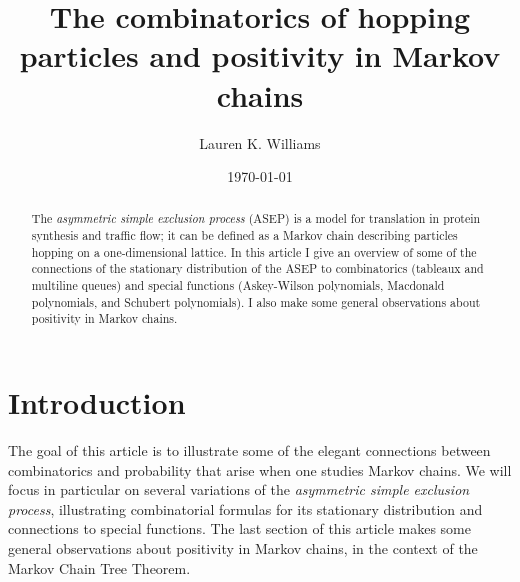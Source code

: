 \documentclass[11pt]{amsart}
\theoremstyle{definition}
\theoremstyle{remark}
\begin{document}
\begin{abstract}
The \emph{asymmetric simple exclusion process} (ASEP) 
is a model for translation in protein synthesis and traffic flow;
it can be defined as a Markov chain
describing particles hopping on a one-dimensional lattice.
In this article
I give an overview of some of the connections of 
the stationary distribution of the ASEP 
 to combinatorics (tableaux and multiline queues)
and special functions (Askey-Wilson polynomials,
Macdonald polynomials, and Schubert polynomials).  I also make some general 
observations about  positivity in Markov chains.
\end{abstract}


	\title[The combinatorics of hopping particles and positivity in Markov chains]{The combinatorics of hopping particles and positivity in Markov chains}
	\date{\today}
\author{Lauren K. Williams}
	\address{Department of Mathematics, 1 Oxford Street, Cambridge,
	MA 02138}
\maketitle

\section{Introduction}

The goal of this article is to illustrate some of the elegant connections
between combinatorics and probability that arise when one studies Markov chains.
We will focus in particular on several variations of the 
\emph{asymmetric simple exclusion process}, illustrating combinatorial 
formulas for its stationary distribution and connections to special functions.
The last section of this article  makes some general observations about 
positivity in Markov chains, in the context of the 
 Markov Chain Tree Theorem.


\end{document}

